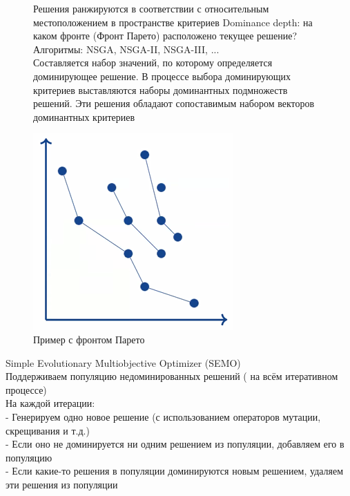 \begin{figure}[!ht]
Решения ранжируются в соответствии с относительным местоположением в
пространстве критериев
Dominance depth: на каком фронте (Фронт Парето) расположено текущее решение?
Алгоритмы: NSGA, NSGA-II, NSGA-III, ...\\

Составляется набор значений, по которому определяется доминирующее решение. В процессе выбора доминирующих критериев выставляются наборы доминантных подмножеств решений. Эти решения обладают сопоставимым набором векторов доминантных критериев
\begin{center}
    \includegraphics[width=0.8\linewidth]{images/Dominate_3.PNG}
    \caption{Пример с фронтом Парето}
    \label{fig:mpr}
\end{center}
\end{figure}

\newpage
Simple Evolutionary Multiobjective Optimizer (SEMO)\\
Поддерживаем популяцию недоминированных решений ( на всём итеративном процессе)\\
На каждой итерации:\\
- Генерируем одно новое решение (с использованием операторов
мутации, скрещивания и т.д.)\\
- Если оно не доминируется ни одним решением из популяции,
добавляем его в популяцию\\
- Если какие-то решения в популяции доминируются новым решением,
удаляем эти решения из популяции\\

